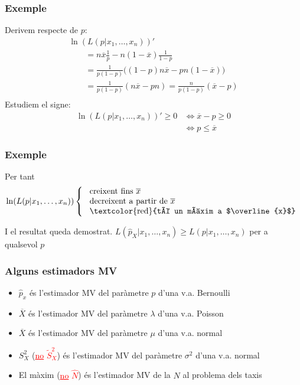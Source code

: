 \documentclass[12pt,t]{beamer}
\newcommand{\red}[1]{\textcolor{red}{#1}}
\renewcommand{\leq}{\leqslant}
\renewcommand{\geq}{\geqslant}
\theoremstyle{plain}
\theoremstyle{definition}
\begin{document}
\begin{frame}
\frametitle{Exemple}
Derivem respecte de $p$:
$$
\begin{array}{l}
\ln(L(p|x_1,\ldots,x_n))'\\
\qquad \displaystyle=n\overline{x}\frac{1}{p}-n(1-\overline{x})\frac{1}{1-p}\\
\qquad \displaystyle=\frac{1}{p(1-p)}\Big((1-p)n\overline{x}-pn(1-\overline{x})\Big)\\
\qquad \displaystyle=\frac{1}{p(1-p)}(n\overline{x} -pn)=\frac{n}{p(1-p)}(\overline{x} -p)\\
\end{array}
$$
Estudiem el signe:
$$
\begin{array}{rl}
\ln(L(p|x_1,\ldots,x_n))'\geq 0 &\displaystyle \Leftrightarrow \overline{x} -p\geq 0\\ &\displaystyle \Leftrightarrow
p\leq\overline{x}
\end{array}
$$
\end{frame}

\begin{frame}
\frametitle{Exemple}
Per tant
$$
\ln(L(p|x_1,\ldots,x_n))\left\{
\begin{array}{l}
\mbox{ creixent fins $\overline{x}$}\\
\mbox{ decreixent a partir de $\overline{x}$}\\
\mbox{ \red{té un màxim a $\overline{x}$}}
\end{array}\right.
$$

\vspace{1cm}

I el resultat queda demostrat. $L(\widehat{p}_X|x_1,\ldots,x_n)\geq L(p|x_1,\ldots,x_n)$ per a qualsevol  $p$
\end{frame}

\begin{frame}
\frametitle{Alguns estimadors MV}
\vspace*{-1ex}

\begin{itemize}
\item $\widehat{p}_x$ és l'estimador MV del paràmetre $p$ d'una v.a. Bernoulli
\medskip

\item $\overline{X}$  és l'estimador MV del paràmetre $\lambda$ d'una v.a. Poisson
\medskip

\item $\overline{X}$  és l'estimador MV del paràmetre $\mu$ d'una v.a. normal
\medskip

\item $S_X^2$ (\red{\underline{no} $\widetilde{S}_X^2$}) és l'estimador MV del paràmetre $\sigma^2$ d'una v.a. normal
\medskip

\item El màxim (\red{\underline{no}  $\widehat{N}$}) és l'estimador MV de la $N$ al problema dels taxis

\end{itemize}

\end{frame}
\end{document}
